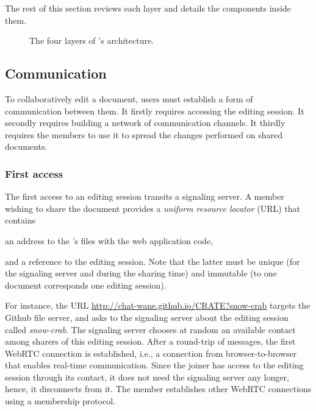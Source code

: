 The rest of this section reviews each layer and details the components inside
them.

\begin{figure}
  \centering
  
  \caption{\label{fig:architecture}The four layers of \CRATE's architecture.}
\end{figure}

\subsection{Communication}
\label{subsec:communication}

To collaboratively edit a document, users must establish a form of communication
between them. It firstly requires accessing the editing session. It secondly
requires building a network of communication channels. It thirdly requires the
members to use it to spread the changes performed on shared documents.  

\subsubsection{First access}

The first access to an editing session transits a signaling server. A member
wishing to share the document provides a \emph{uniform resource locator} (URL)
that contains
\begin{inparaenum}[(i)]
\item an address to the \CRATE's files with the web application
  code,
\item and a reference to the editing session. Note that the latter must be
  unique (for the signaling server and during the sharing time) and
  immutable (to one document corresponds one editing session).
\end{inparaenum}
For instance, the URL \url{http://chat-wane.github.io/CRATE?snow-crab} targets
the Github file server, and asks to the signaling server about the editing
session called \emph{snow-crab}.  The signaling server chooses at random an
available contact among sharers of this editing session. After a round-trip of
messages, the first WebRTC connection is established, i.e., a connection from
browser-to-browser that enables real-time communication. Since the joiner has
access to the editing session through its contact, it does not need the
signaling server any longer, hence, it disconnects from it. The member
establishes other WebRTC connections using a membership protocol.

